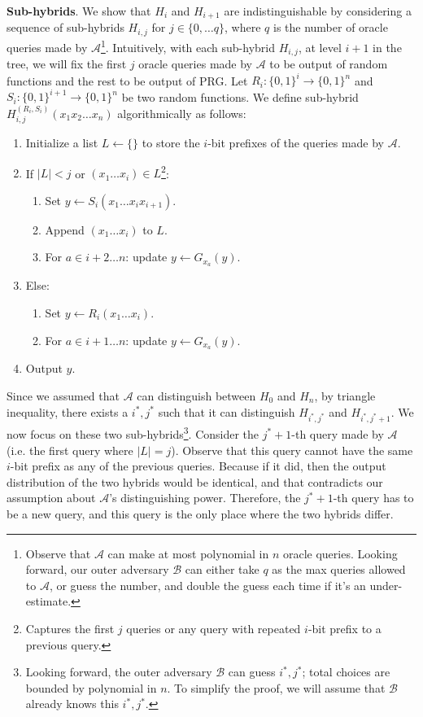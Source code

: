 \noindent \textbf{Sub-hybrids}. We show that $H_{i}$ and $H_{i+1}$ are indistinguishable by considering a sequence of sub-hybrids $H_{i,j}$ for $j \in \{0,\ldots q\}$, where $q$ is the number of oracle queries made by $\mathcal{A}$\footnote{Observe that $\mathcal{A}$ can make at most polynomial in $n$ oracle queries. Looking forward, our outer adversary $\mathcal{B}$ can either take $q$ as the max queries allowed to $\mathcal{A}$, or guess the number, and double the guess each time if it's an under-estimate.}.
Intuitively, with each sub-hybrid $H_{i,j}$, at level $i+1$ in the tree, we will fix the first $j$ oracle queries made by $\mathcal{A}$ to be output of random functions and the rest to be output of PRG. Let $R_i: \{0, 1\}^i \to \{0, 1\}^n$ and $S_{i}: \{0, 1\}^{i+1} \to \{0, 1\}^n$ be two random functions.
We define sub-hybrid $H_{i,j}^{(R_i, S_{i})}(x_1x_2\dots x_n)$ algorithmically as follows:
\begin{enumerate}
    \item Initialize a list $L \gets \{\}$ to store the $i$-bit prefixes of the queries made by $\mathcal{A}$.
    \item If $|L| < j$ or $(x_1\dots x_i) \in L$\footnote{Captures the first $j$ queries or any query with repeated $i$-bit prefix to a previous query.}:
          \begin{enumerate}
              \item Set $y \gets S_i(x_1\dots x_i x_{i+1})$.
              \item Append $(x_1\dots x_i)$ to $L$.
              \item For $a \in i+2 \dots n$: update $y \gets G_{x_a}(y)$.
          \end{enumerate}
    \item Else:
          \begin{enumerate}
              \item Set $y \gets R_i(x_1\dots x_i)$.
              \item For $a \in i+1 \dots n$: update $y \gets G_{x_a}(y)$.
          \end{enumerate}
    \item Output $y$.
\end{enumerate}

Since we assumed that $\mathcal{A}$ can distinguish between $H_0$ and $H_n$, by triangle inequality, there exists a $i^*, j^*$ such that it can distinguish $H_{i^*,j^*}$ and $H_{i^*,j^*+1}$. We now focus on these two sub-hybrids\footnote{Looking forward, the outer adversary $\mathcal{B}$ can guess $i^*, j^*$; total choices are bounded by polynomial in $n$. To simplify the proof, we will assume that $\mathcal{B}$ already knows this $i^*, j^*$.}. Consider the $j^*+1$-th query made by $\mathcal{A}$ (i.e. the first query where $|L|=j$). Observe that this query cannot have the same $i$-bit prefix as any of the previous queries. Because if it did, then the output distribution of the two hybrids would be identical, and that contradicts our assumption about $\mathcal{A}$'s distinguishing power. Therefore, the $j^*+1$-th query has to be a new query, and this query is the only place where the two hybrids differ.\smallskip

